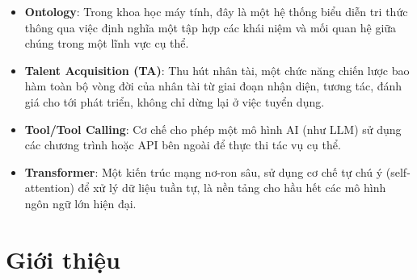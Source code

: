 \documentclass{article}
\renewcommand{\baselinestretch}{1.5}
\newcommand{\nocontentsline}[3]{}
\newcommand{\tocless}[2]{\bgroup\let\addcontentsline=\nocontentsline#1{#2}\egroup}
\begin{document}
\begin{itemize}[topsep=0pt, itemsep=0pt, leftmargin=0pt]
    \item \textbf{Ontology}: Trong khoa học máy tính, đây là một hệ thống biểu diễn tri thức thông qua việc định nghĩa một tập hợp các khái niệm và mối quan hệ giữa chúng trong một lĩnh vực cụ thể.
    \item \textbf{Talent Acquisition (TA)}: Thu hút nhân tài, một chức năng chiến lược bao hàm toàn bộ vòng đời của nhân tài từ giai đoạn nhận diện, tương tác, đánh giá cho tới phát triển, không chỉ dừng lại ở việc tuyển dụng.
    \item \textbf{Tool/Tool Calling}: Cơ chế cho phép một mô hình AI (như LLM) sử dụng các chương trình hoặc API bên ngoài để thực thi tác vụ cụ thể.
    \item \textbf{Transformer}: Một kiến trúc mạng nơ-ron sâu, sử dụng cơ chế tự chú ý (self-attention) để xử lý dữ liệu tuần tự, là nền tảng cho hầu hết các mô hình ngôn ngữ lớn hiện đại.
\end{itemize}

\cleardoublepage
{}
{}
\renewcommand{\listfigurename}{DANH MỤC ẢNH}
{
\renewcommand{\baselinestretch}{1.4}\selectfont
\setlength{\parskip}{0pt}
\listoffigures
}

\cleardoublepage
{}
{}
\renewcommand{\listtablename}{DANH MỤC BẢNG}
{
\renewcommand{\baselinestretch}{1.4}\selectfont
\setlength{\parskip}{0pt}
\listoftables
}


\cleardoublepage
\renewcommand{\contentsname}{MỤC LỤC}
{
\renewcommand{\baselinestretch}{1.25}\selectfont
\setlength{\parskip}{0pt}
\tableofcontents
}

\cleardoublepage

\titlespacing{\section}{0pt}{0pt}{20pt} %
\tocless\section{Giới thiệu}
\addcontentsline{toc}{section}{\numberline{}CHƯƠNG 1: GIỚI THIỆU}
\end{document}
